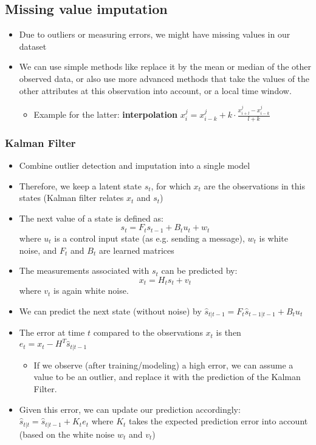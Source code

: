 \subsection{Missing value imputation}
\begin{itemize}
	\item Due to outliers or measuring errors, we might have missing values in our dataset
	\item We can use simple methods like replace it by the mean or median of the other observed data, or also use more advanced methods that take the values of the other attributes at this observation into account, or a local time window.
	\begin{itemize}
		\item Example for the latter: \textbf{interpolation} $x_{i}^{j} = x_{i-k}^{j} + k \cdot \frac{x_{i+l}^{j} - x_{i-k}^{j}}{l+k}$
	\end{itemize}
\end{itemize}
\subsubsection{Kalman Filter}
\begin{itemize}
	\item Combine outlier detection and imputation into a single model
	\item Therefore, we keep a latent state $s_t$, for which $x_t$ are the observations in this states (Kalman filter relates $x_t$ and $s_t$)
	\item The next value of a state is defined as: $$s_t = F_t s_{t-1} + B_t u_t + w_t$$ where $u_t$ is a control input state (as e.g. sending a message), $w_t$ is white noise, and $F_t$ and $B_t$ are learned matrices
	\item The measurements associated with $s_t$ can be predicted by: $$x_t = H_t s_t + v_t$$ where $v_t$ is again white noise.
	\item We can predict the next state (without noise) by $\hat{s}_{t|t-1} = F_t \hat{s}_{t-1|t-1} + B_t u_t$
	\item The error at time $t$ compared to the observations $x_t$ is then $e_t = x_t - H^T \hat{s}_{t|t-1}$
	\begin{itemize}
		\item If we observe (after training/modeling) a high error, we can assume a value to be an outlier, and replace it with the prediction of the Kalman Filter.
	\end{itemize}
	\item Given this error, we can update our prediction accordingly: $\hat{s}_{t|t} = \hat{s}_{t|t-1} + K_t e_t$ where $K_t$ takes the expected prediction error into account (based on the white noise $w_t$ and $v_t$)
\end{itemize}
